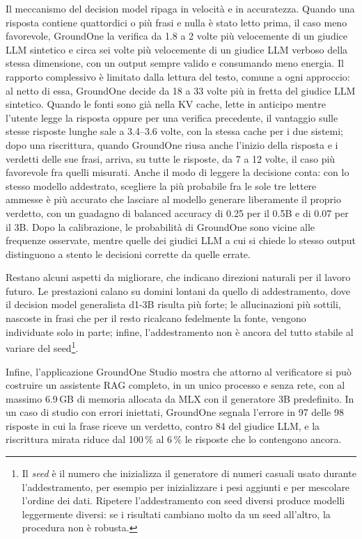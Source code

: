 Il meccanismo del decision model ripaga in velocità e in accuratezza. Quando una risposta contiene quattordici o più frasi e nulla è stato letto prima, il caso meno favorevole, GroundOne la verifica da 1.8 a 2 volte più velocemente di un giudice LLM sintetico e circa sei volte più velocemente di un giudice LLM verboso della stessa dimensione, con un output sempre valido e consumando meno energia. Il rapporto complessivo è limitato dalla lettura del testo, comune a ogni approccio: al netto di essa, GroundOne decide da 18 a 33 volte più in fretta del giudice LLM sintetico. Quando le fonti sono già nella KV cache, lette in anticipo mentre l'utente legge la risposta oppure per una verifica precedente, il vantaggio sulle stesse risposte lunghe sale a 3.4--3.6 volte, con la stessa cache per i due sistemi; dopo una riscrittura, quando GroundOne riusa anche l'inizio della risposta e i verdetti delle sue frasi, arriva, su tutte le risposte, da 7 a 12 volte, il caso più favorevole fra quelli misurati. Anche il modo di leggere la
decisione conta: con lo stesso modello addestrato, scegliere la più probabile fra le sole tre lettere ammesse è più
accurato che lasciare al modello generare liberamente il proprio verdetto, con un guadagno di balanced accuracy di 0.25
per il 0.5B e di 0.07 per il 3B. Dopo la
calibrazione, le probabilità di GroundOne sono vicine alle frequenze osservate, mentre quelle dei giudici LLM a cui
si chiede lo stesso output distinguono a stento le decisioni corrette da quelle errate.

Restano alcuni aspetti da migliorare, che indicano direzioni naturali per il lavoro futuro. Le prestazioni calano su
domini lontani da quello di addestramento, dove il decision model generalista d1-3B risulta più forte; le allucinazioni più
sottili, nascoste in frasi che per il resto ricalcano fedelmente la fonte, vengono individuate solo in parte; infine,
l'addestramento non è ancora del tutto stabile al variare del seed\footnote{Il \emph{seed} è il numero che inizializza
il generatore di numeri casuali usato durante l'addestramento, per esempio per inizializzare i pesi aggiunti e per
mescolare l'ordine dei dati. Ripetere l'addestramento con seed diversi produce modelli leggermente diversi: se i risultati cambiano molto da un seed all'altro, la procedura non è robusta.}.

Infine, l'applicazione GroundOne Studio mostra che attorno al verificatore si può costruire un assistente RAG completo,
in un unico processo e senza rete, con al massimo 6.9\,GB di memoria allocata da MLX con il generatore 3B predefinito. In un caso di studio con errori
iniettati, GroundOne segnala l'errore in 97 delle 98 risposte in cui la frase riceve un verdetto, contro 84 del giudice LLM,
e la riscrittura mirata riduce dal 100\,\% al 6\,\% le risposte che lo contengono ancora.

